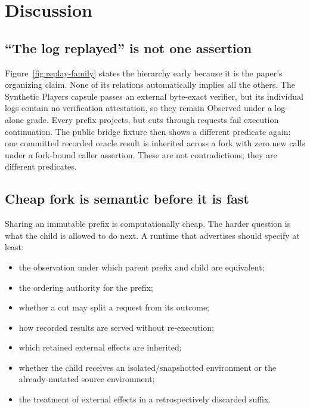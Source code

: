 \section{Discussion}
\label{sec:discussion}

\subsection{``The log replayed'' is not one assertion}

Figure~\ref{fig:replay-family} states the hierarchy early because it is the
paper's organizing claim.  None of its relations automatically implies all the
others.  The Synthetic Players capsule passes an external byte-exact verifier,
but its individual logs contain no verification attestation, so they remain
Observed under a log-alone grade.  Every prefix projects, but cuts through
requests fail execution continuation.  The public bridge fixture then shows a
different predicate again: one committed recorded oracle result is inherited
across a fork with zero new calls under a fork-bound caller assertion.  These
are not contradictions; they are different predicates.

\subsection{Cheap fork is semantic before it is fast}

Sharing an immutable prefix is computationally cheap.  The harder question is
what the child is allowed to do next.  A runtime that advertises 
should specify at least:

\begin{itemize}[leftmargin=*]
  \item the observation under which parent prefix and child are equivalent;
  \item the ordering authority for the prefix;
  \item whether a cut may split a request from its outcome;
  \item how recorded results are served without re-execution;
  \item which retained external effects are inherited;
  \item whether the child receives an isolated/snapshotted environment or the
  already-mutated source environment;
  \item the treatment of external effects in a retrospectively discarded
  suffix.
\end{itemize}

